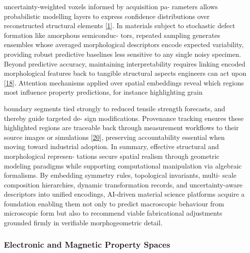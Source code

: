 \documentclass[
]{article}
\begin{document}
uncertainty-weighted voxels informed by acquisition pa- rameters allows
probabilistic modelling layers to express confidence distributions over
reconstructed structural elements
{[}\protect\hyperlink{_bookmark41}{1}{]}. In materials subject to
stochastic defect formation like amorphous semiconduc- tors, repeated
sampling generates ensembles whose averaged morphological descriptors
encode expected variability, providing robust predictive baselines less
sensitive to any single noisy specimen. Beyond predictive accuracy,
maintaining interpretability requires linking encoded morphological
features back to tangible structural aspects engineers can act upon
{[}\protect\hyperlink{_bookmark58}{18}{]}. Attention mechanisms applied
over spatial embeddings reveal which regions most influence property
predictions, for instance highlighting grain

boundary segments tied strongly to reduced tensile strength forecasts,
and thereby guide targeted de- sign modifications. Provenance tracking
ensures these highlighted regions are traceable back through measurement
workflows to their source images or simulations
{[}\protect\hyperlink{_bookmark60}{20}{]}, preserving accountability
essential when moving toward industrial adoption. In summary, effective
structural and morphological represen- tations secure spatial realism
through geometric modeling paradigms while supporting computational
manipulation via algebraic formalisms. By embedding symmetry rules,
topological invariants, multi- scale composition hierarchies, dynamic
transformation records, and uncertainty-aware descriptors into unified
encodings, AI-driven material science platforms acquire a foundation
enabling them not only to predict macroscopic behaviour from microscopic
form but also to recommend viable fabricational adjustments grounded
firmly in verifiable morphogeometric detail.

\hypertarget{electronic-and-magnetic-property-spaces}{%
\subsubsection{Electronic and Magnetic Property
Spaces}\label{electronic-and-magnetic-property-spaces}}
\end{document}
